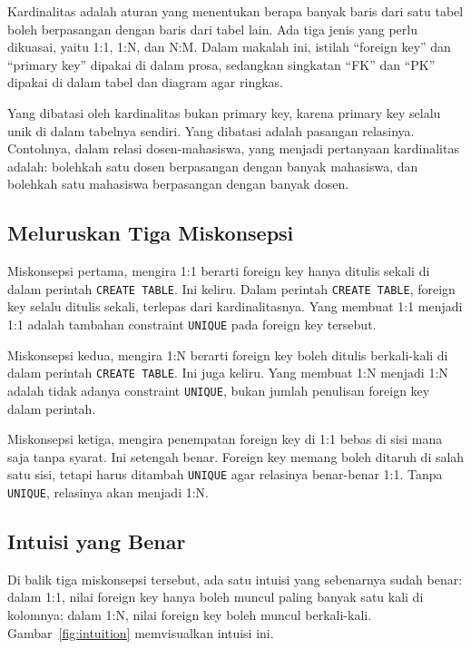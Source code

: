 \documentclass[11pt,a4paper]{article}
\begin{document}
Kardinalitas adalah aturan yang menentukan berapa banyak baris dari satu tabel boleh berpasangan dengan baris dari tabel lain. Ada tiga jenis yang perlu dikuasai, yaitu 1:1, 1:N, dan N:M. Dalam makalah ini, istilah ``foreign key'' dan ``primary key'' dipakai di dalam prosa, sedangkan singkatan ``FK'' dan ``PK'' dipakai di dalam tabel dan diagram agar ringkas.

Yang dibatasi oleh kardinalitas bukan primary key, karena primary key selalu unik di dalam tabelnya sendiri. Yang dibatasi adalah pasangan relasinya. Contohnya, dalam relasi dosen-mahasiswa, yang menjadi pertanyaan kardinalitas adalah: bolehkah satu dosen berpasangan dengan banyak mahasiswa, dan bolehkah satu mahasiswa berpasangan dengan banyak dosen.

\subsection{Meluruskan Tiga Miskonsepsi}

Miskonsepsi pertama, mengira 1:1 berarti foreign key hanya ditulis sekali di dalam perintah \texttt{CREATE TABLE}. Ini keliru. Dalam perintah \texttt{CREATE TABLE}, foreign key selalu ditulis sekali, terlepas dari kardinalitasnya. Yang membuat 1:1 menjadi 1:1 adalah tambahan constraint \texttt{UNIQUE} pada foreign key tersebut.

Miskonsepsi kedua, mengira 1:N berarti foreign key boleh ditulis berkali-kali di dalam perintah \texttt{CREATE TABLE}. Ini juga keliru. Yang membuat 1:N menjadi 1:N adalah tidak adanya constraint \texttt{UNIQUE}, bukan jumlah penulisan foreign key dalam perintah.

Miskonsepsi ketiga, mengira penempatan foreign key di 1:1 bebas di sisi mana saja tanpa syarat. Ini setengah benar. Foreign key memang boleh ditaruh di salah satu sisi, tetapi harus ditambah \texttt{UNIQUE} agar relasinya benar-benar 1:1. Tanpa \texttt{UNIQUE}, relasinya akan menjadi 1:N.

\subsection{Intuisi yang Benar}

Di balik tiga miskonsepsi tersebut, ada satu intuisi yang sebenarnya sudah benar: dalam 1:1, nilai foreign key hanya boleh muncul paling banyak satu kali di kolomnya; dalam 1:N, nilai foreign key boleh muncul berkali-kali. Gambar~\ref{fig:intuition} memvisualkan intuisi ini.
\end{document}
